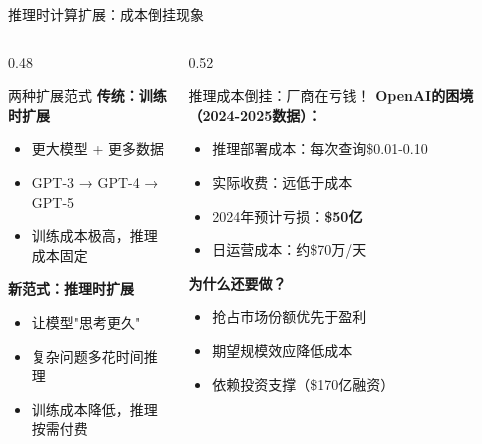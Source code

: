 \documentclass[aspectratio=169,11pt]{beamer}
\begin{document}
\begin{frame}{推理时计算扩展：成本倒挂现象}
    \begin{columns}
        \begin{column}{0.48\textwidth}
            \begin{block}{两种扩展范式}
                \textbf{传统：训练时扩展}
                \begin{itemize}
                    \item 更大模型 + 更多数据
                    \item GPT-3 → GPT-4 → GPT-5
                    \item 训练成本极高，推理成本固定
                \end{itemize}
                
                \vspace{0.2cm}
                \textbf{新范式：推理时扩展}
                \begin{itemize}
                    \item 让模型"思考更久"
                    \item 复杂问题多花时间推理
                    \item 训练成本降低，推理按需付费
                \end{itemize}
            \end{block}
        \end{column}
        \begin{column}{0.52\textwidth}
            \begin{alertblock}{推理成本倒挂：厂商在亏钱！}
                \footnotesize
                \textbf{OpenAI的困境（2024-2025数据）：}
                \begin{itemize}
                    \item 推理部署成本：每次查询\$0.01-0.10
                    \item 实际收费：远低于成本
                    \item 2024年预计亏损：\textbf{\$50亿}
                    \item 日运营成本：约\$70万/天
                \end{itemize}
                
                \vspace{0.1cm}
                \textbf{为什么还要做？}
                \begin{itemize}
                    \item 抢占市场份额优先于盈利
                    \item 期望规模效应降低成本
                    \item 依赖投资支撑（\$170亿融资）
                \end{itemize}
            \end{alertblock}
        \end{column}
    \end{columns}
    

\end{frame}
\end{document}
